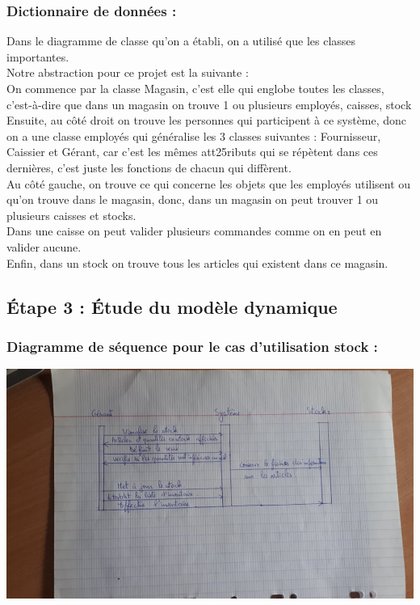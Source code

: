 \documentclass[french,10pt,a4paper]{report}
\begin{document}
\subsubsection{Dictionnaire de données :}
Dans le diagramme de classe qu’on a établi, on a utilisé que les classes importantes.\\
Notre abstraction pour ce projet est la suivante :\\
On commence par la classe Magasin, c’est elle qui englobe toutes les classes, c’est-à-dire que dans un magasin on trouve 1 ou plusieurs employés, caisses, stock\\
Ensuite, au côté droit on trouve les personnes qui participent à ce système, donc on a une classe employés qui généralise les 3 classes suivantes : Fournisseur, Caissier et Gérant, car c’est les mêmes att25ributs qui se répètent dans ces dernières, c’est juste les fonctions de chacun qui diffèrent.\\
Au côté gauche, on trouve ce qui concerne les objets que les employés utilisent ou qu’on trouve dans le magasin, donc,  dans un magasin on peut trouver 1 ou plusieurs caisses et stocks.\\
Dans une caisse on peut valider plusieurs commandes comme on en peut en valider aucune.\\
Enfin, dans un stock on trouve tous les articles qui existent dans ce magasin.

\subsection{\textcolor{bb}{Étape 3 : Étude du modèle dynamique}}
\subsubsection{Diagramme de séquence pour le cas d’utilisation stock :}
\begin{center}
 \includegraphics[scale=0.36]{captures/g_it2_2.jpg}
\end{center}
\end{document}
